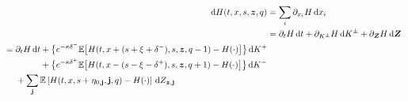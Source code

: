 \begin{align}
\d H (t,x,s,\bz,q) & = \sum\limits_i \partial_{x_i} H \dx_i \\
& = \partial_t H \dt + \partial_{K^{\pm}} H \d {K^{\pm}} + \partial_{\bZ} H \d {\bZ} \\
\begin{split}
& = \partial_t H \dt + \bigl\lbrace e^{ -\kappa \delta^{-}} \E \bigl[ H(t,x+(s+\xi+\delta^-),s,\bz,q-1) - H(\cdot) \bigr] \bigr\rbrace \d K^+\\
& \hphantom{{}={} \partial_t H \dt} + \bigl\lbrace e^{ -\kappa \delta^{+}} \E \bigl[ H(t,x-(s-\xi-\delta^+),s,\bz,q+1) - H(\cdot) \bigr] \bigr\rbrace \d K^-\\
& \hphantom{{}={}} + \sum_{\bj} \E \left[ H(t,x,s+\eta_{0,\bj},\bj,q) - H(\cdot) \right] \d Z_{\bz,\bj}
\end{split}
\end{align}

